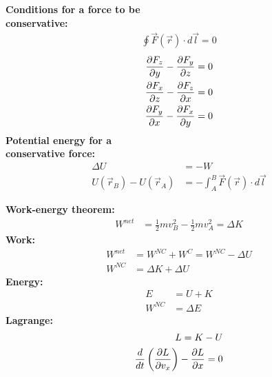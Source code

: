 \newpage
\begin{importantEquations}
\begin{multicols}{2}
\textbf{Conditions for a force to be\\ conservative:}
\begin{align*}
\oint \vec F(\vec r) \cdot d\vec l = 0
\end{align*}
\begin{align*}
\frac{\partial F_z}{\partial y}-\frac{\partial F_y}{\partial z} &= 0 \nonumber\\
\frac{\partial F_x}{\partial z}-\frac{\partial F_z}{\partial x} &= 0\nonumber\\
\frac{\partial F_y}{\partial x}-\frac{\partial F_x}{\partial y} &= 0
\end{align*}
\textbf{Potential energy for a\\ conservative force:}
\begin{align*}
\Delta U&=-W\\
U(\vec r_B) - U(\vec r_A)&= - \int_A^B \vec F(\vec r) \cdot d\vec l
\end{align*}
\columnbreak

\textbf{Work-energy theorem:}
\begin{align*}
W^{net}&=\frac{1}{2}mv_B^2-\frac{1}{2}mv_A^2=\Delta K
\end{align*}
\textbf{Work:}
\begin{align*}
W^{net}&=W^{NC}+W^{C}=W^{NC}-\Delta U\\
W^{NC}&=\Delta K+\Delta U
\end{align*}
\textbf{Energy:}
\begin{align*}
E&=U+K\\
W^{NC}&=\Delta E
\end{align*}
\textbf{Lagrange:}
\begin{align*}
L = K - U\\
\frac{d}{dt}\left(\frac{\partial L}{\partial v_x}\right)-\frac{\partial L}{\partial x} = 0
\end{align*}
\end{multicols}
\end{importantEquations}


\newpage
